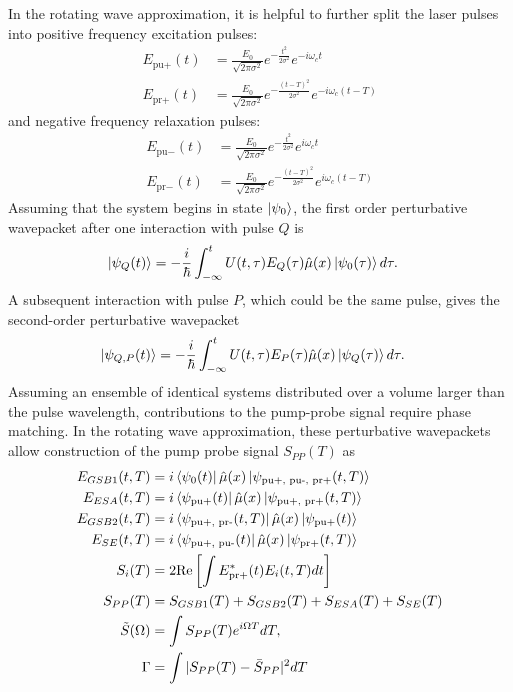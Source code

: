 In the rotating wave approximation, it is helpful to further split the laser pulses into positive frequency excitation pulses:
\begin{align}
	E_{\text{pu}+}(t) &= \frac{E_0}{\sqrt{2 \pi \sigma^2}} e^{-\frac{t^2}{2 \sigma^2} } e^{-i \omega_c t} \\
	E_{\text{pr}+}(t) &= \frac{E_0}{\sqrt{2 \pi \sigma^2}} e^{-\frac{\left(t-T\right)^2}{2 \sigma^2} }  e^{-i \omega_c \left(t-T\right)}
\end{align}
and negative frequency relaxation pulses:
\begin{align}
	E_{\text{pu}-}(t) &= \frac{E_0}{\sqrt{2 \pi \sigma^2}} e^{-\frac{t^2}{2 \sigma^2} } e^{i \omega_c t} \\
	E_{\text{pr}-}(t) &= \frac{E_0}{\sqrt{2 \pi \sigma^2}} e^{-\frac{\left(t-T\right)^2}{2 \sigma^2} }  e^{i \omega_c \left(t-T\right)}
\end{align}
Assuming that the system begins in state $\ket{\psi_0}$, the first order perturbative wavepacket after one interaction with pulse $Q$ is
\begin{align}
	\ket{\psi_{Q} (t)}  &= -\frac{i}{\hbar} \int_{-\infty}^{t} U(t, \tau) E_{Q}(\tau) \hat{\mu}(x) \ket{\psi_0 (\tau)} d \tau.
\end{align}
A subsequent interaction with pulse $P$, which could be the same pulse, gives the second-order perturbative wavepacket
\begin{align}
	\ket{\psi_{Q, P} (t)}  &= -\frac{i}{\hbar} \int_{-\infty}^{t} U(t, \tau) E_P (\tau) \hat{\mu}(x) \ket{\psi_Q (\tau)} d \tau.
\end{align}
Assuming an ensemble of identical systems distributed over a volume larger than the pulse wavelength, contributions to the pump-probe signal require phase matching. In the rotating wave approximation, these perturbative wavepackets allow construction of the pump probe signal $S_{PP}(T)$ as
\begin{align*}
	E_{GSB1} (t, T) &=  i \bra{\psi_{0} (t)} \hat{\mu} (x) \ket{\psi_{\text{pu+, pu-, pr+}} (t, T)}\\
	E_{ESA} (t, T) &=  i \bra{\psi_{\text{pu+}} (t)} \hat{\mu} (x) \ket{\psi_{\text{pu+, pr+}} (t, T)}\\
	E_{GSB2} (t, T) &=  i \bra{\psi_{\text{pu+, pr-}} (t, T)} \hat{\mu} (x) \ket{\psi_{\text{pu+}} (t)}\\
	E_{SE} (t, T) &=  i \bra{\psi_{\text{pu+, pu-}} (t)} \hat{\mu} (x) \ket{\psi_{\text{pr+}} (t, T)} \\
	S_{i} (T) &= 2 \text{Re} \left[ \int E^*_{\text{pr+}} (t) E_i (t, T) dt  \right] \\
	S_{PP} (T) &= S_{GSB1} (T) + S_{GSB2} (T) + S_{ESA} (T) + S_{SE} (T) \\
	\tilde{S}(\Omega) &= \int S_{PP} (T) e^{i \Omega T} d T,\\
	\Gamma &= \int |S_{PP}(T)-\bar{S}_{PP}|^2 dT
\end{align*}
